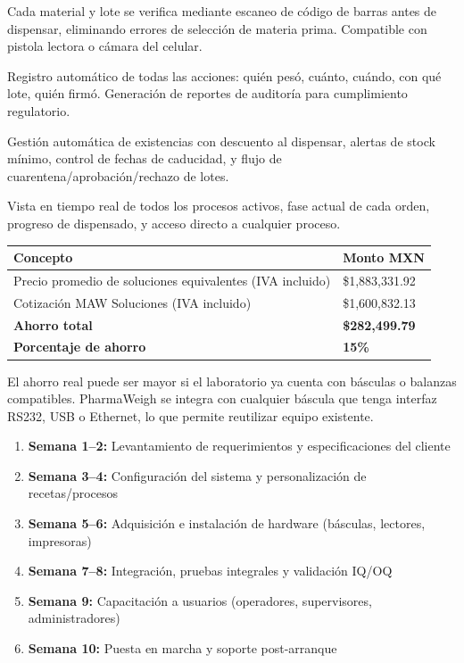 \documentclass[11pt]{article}
\begin{document}
Cada material y lote se verifica mediante escaneo de código de barras antes de dispensar, eliminando errores de selección de materia prima. Compatible con pistola lectora o cámara del celular.

Registro automático de todas las acciones: quién pesó, cuánto, cuándo, con qué lote, quién firmó. Generación de reportes de auditoría para cumplimiento regulatorio.

Gestión automática de existencias con descuento al dispensar, alertas de stock mínimo, control de fechas de caducidad, y flujo de cuarentena/aprobación/rechazo de lotes.

Vista en tiempo real de todos los procesos activos, fase actual de cada orden, progreso de dispensado, y acceso directo a cualquier proceso.


\begin{center}
\begin{tabularx}{0.85\linewidth}{@{}>{\raggedright\arraybackslash}X >{\raggedleft\arraybackslash}p{3.5cm}@{}}
\toprule
\textbf{Concepto} & \textbf{Monto MXN} \\
\midrule
Precio promedio de soluciones equivalentes (IVA incluido) & \$1,883,331.92 \\
Cotización MAW Soluciones (IVA incluido) & \$1,600,832.13 \\
\midrule
\textbf{Ahorro total} & \textbf{\$282,499.79} \\
\textbf{Porcentaje de ahorro} & \textbf{15\%} \\
\bottomrule
\end{tabularx}
\end{center}

\begin{cajaInfo}
El ahorro real puede ser mayor si el laboratorio ya cuenta con básculas o balanzas compatibles. PharmaWeigh se integra con cualquier báscula que tenga interfaz RS232, USB o Ethernet, lo que permite reutilizar equipo existente.
\end{cajaInfo}


\begin{enumerate}
    \item \textbf{Semana 1--2:} Levantamiento de requerimientos y especificaciones del cliente
    \item \textbf{Semana 3--4:} Configuración del sistema y personalización de recetas/procesos
    \item \textbf{Semana 5--6:} Adquisición e instalación de hardware (básculas, lectores, impresoras)
    \item \textbf{Semana 7--8:} Integración, pruebas integrales y validación IQ/OQ
    \item \textbf{Semana 9:} Capacitación a usuarios (operadores, supervisores, administradores)
    \item \textbf{Semana 10:} Puesta en marcha y soporte post-arranque
\end{enumerate}
\end{document}
